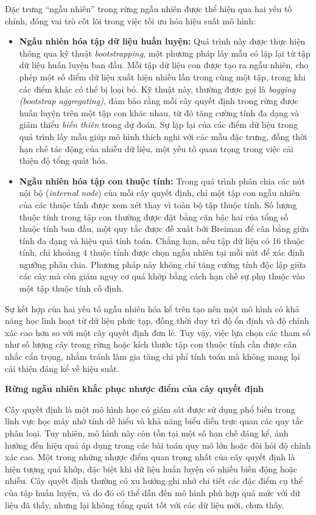 Đặc trưng ``ngẫu nhiên''  trong rừng ngẫu nhiên được thể hiện qua hai yếu tố chính, đóng vai trò cốt lõi trong việc tối ưu hóa hiệu suất mô hình:
\begin{itemize}
    \item \textbf{Ngẫu nhiên hóa tập dữ liệu huấn luyện:} Quá trình này được thực hiện thông qua kỹ thuật \textit{bootstrapping}, một phương pháp lấy mẫu có lặp lại từ tập dữ liệu huấn luyện ban đầu. Mỗi tập dữ liệu con được tạo ra ngẫu nhiên, cho phép một số điểm dữ liệu xuất hiện nhiều lần trong cùng một tập, trong khi các điểm khác có thể bị loại bỏ. Kỹ thuật này, thường được gọi là \textit{bagging (bootstrap aggregating)}, đảm bảo rằng mỗi cây quyết định trong rừng được huấn luyện trên một tập con khác nhau, từ đó tăng cường tính đa dạng và giảm thiểu \textit{biến thiên} trong dự đoán. Sự lặp lại của các điểm dữ liệu trong quá trình lấy mẫu giúp mô hình thích nghi với các mẫu đặc trưng, đồng thời hạn chế tác động của nhiễu dữ liệu, một yếu tố quan trọng trong việc cải thiện độ tổng quát hóa.
    \item \textbf{Ngẫu nhiên hóa tập con thuộc tính:} Trong quá trình phân chia các nút nội bộ (\textit{internal node}) của mỗi cây quyết định, chỉ một tập con ngẫu nhiên của các thuộc tính được xem xét thay vì toàn bộ tập thuộc tính. Số lượng thuộc tính trong tập con thường được đặt bằng căn bậc hai của tổng số thuộc tính ban đầu, một quy tắc được đề xuất bởi Breiman để cân bằng giữa tính đa dạng và hiệu quả tính toán. Chẳng hạn, nếu tập dữ liệu có 16 thuộc tính, chỉ khoảng 4 thuộc tính được chọn ngẫu nhiên tại mỗi nút để xác định ngưỡng phân chia. Phương pháp này không chỉ tăng cường tính độc lập giữa các cây mà còn giảm nguy cơ quá khớp bằng cách hạn chế sự phụ thuộc vào một tập thuộc tính cố định.
\end{itemize}
Sự kết hợp của hai yếu tố ngẫu nhiên hóa kể trên tạo nên một mô hình có khả năng học linh hoạt từ dữ liệu phức tạp, đồng thời duy trì độ ổn định và độ chính xác cao hơn so với một cây quyết định đơn lẻ. Tuy vậy, việc lựa chọn các tham số như số lượng cây trong rừng hoặc kích thước tập con thuộc tính cần được cân nhắc cẩn trọng, nhằm tránh làm gia tăng chi phí tính toán mà không mang lại cải thiện đáng kể về hiệu suất.

\textbf{\large R}\textbf{ừng ngẫu nhiên khắc phục nhược điểm của cây quyết định} 

Cây quyết định là một mô hình học có giám sát được sử dụng phổ biến trong lĩnh vực học máy nhờ tính dễ hiểu và khả năng biểu diễn trực quan các quy tắc phân loại. Tuy nhiên, mô hình này còn tồn tại một số hạn chế đáng kể, ảnh hưởng đến hiệu quả áp dụng trong các bài toán quy mô lớn hoặc đòi hỏi độ chính xác cao. Một trong những nhược điểm quan trọng nhất của cây quyết định là hiện tượng quá khớp, đặc biệt khi dữ liệu huấn luyện có nhiều biến động hoặc nhiễu. Cây quyết định thường có xu hướng ghi nhớ chi tiết các đặc điểm cụ thể của tập huấn
luyện, và do đó có thể dẫn đến mô hình phù hợp quá mức với dữ liệu đã thấy, nhưng lại không tổng quát tốt với các dữ liệu mới, chưa thấy.

